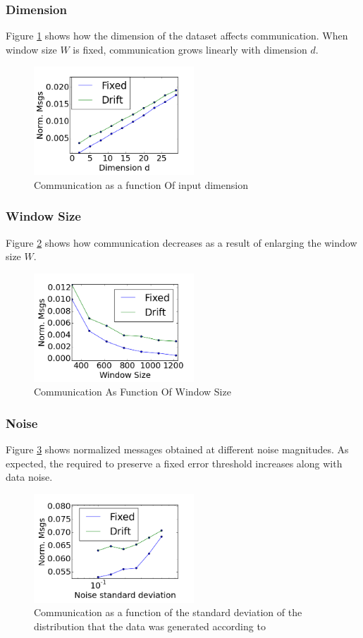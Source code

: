\documentclass[11pt,twocolumn,varwidth=true,a4paper,fleqn]{article}
\begin{document}
\subsubsection{Dimension}
Figure \ref{Dimension} shows how the dimension of the dataset affects
communication.
When window size $W$ is fixed, communication grows linearly with dimension $d$.
	\begin{figure}[h]
	\centering
	\includegraphics[width=60mm]{CommunicationOfFixedVsDrift/Dimension.png}
	\caption{Communication as a function Of input dimension}
	\label{Dimension}
	\end{figure}
\subsubsection{Window Size}
Figure \ref{WindowSize} shows how communication decreases as a result
of enlarging the window size $W$. 
	\begin{figure}[h]
	\centering
	\includegraphics[width=60mm]{CommunicationOfFixedVsDrift/WindowSize.png}
	\caption{Communication As Function Of Window Size}
	\label{WindowSize}
	\end{figure}
\subsubsection{Noise}
Figure \ref{Noise} shows normalized messages obtained at different
noise magnitudes. As expected, the required to preserve a
fixed error threshold increases along with data noise.
\begin{figure}[h]
	\centering
	\includegraphics[width=60mm]{CommunicationOfFixedVsDrift/Noise.png}
	\caption{Communication as a function of the standard deviation of the
	distribution that the data was generated according to}
	\label{Noise}
	\end{figure}
\end{document}
